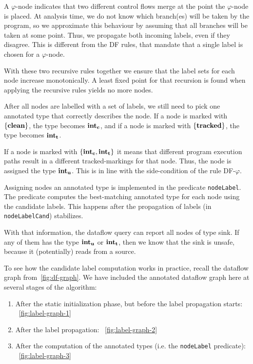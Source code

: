 A $\varphi$-node indicates that two different control flows merge at the point
the $\varphi$-node is placed.
At analysis time, we do not know which branch(es) will be taken by the program,
so we approximate this behaviour by assuming that all branches will be taken at some point.
Thus, we propagate both incoming labels, even if they disagree.
This is different from the DF rules, that mandate that a single label is chosen
for a $\varphi$-node.

With these two recursive rules together we ensure that the label sets for each node
increase monotonically.
A least fixed point for that recursion is found when applying the recursive rules yields
no more nodes.

After all nodes are labelled with a set of labels, we still need to pick one annotated type
that correctly describes the node.
If a node is marked with $\{\textbf{clean}\}$, the type becomes $\textbf{int}_\textbf{c}$,
and if a node is marked with $\{\textbf{tracked}\}$, the type becomes $\textbf{int}_\textbf{t}$.

If a node is marked with $\{\textbf{int}_\textbf{c}, \textbf{int}_\textbf{t}\}$ it means that different
program execution paths result in a different tracked-markings for that node.
Thus, the node is assigned the type $\textbf{int}_\textbf{u}$.
This is in line with the side-condition of the rule \textsc{DF-$\varphi$}.

Assigning nodes an annotated type is implemented in the predicate \texttt{nodeLabel}.
The predicate computes the best-matching annotated type for each node using the candidate labels.
This happens after the propagation of labels (in \texttt{nodeLabelCand}) stabilizes.

With that information, the dataflow query can report all nodes of type sink.
If any of them has the type $\textbf{int}_\textbf{u}$ or $\textbf{int}_\textbf{t}$, then we know that the sink
is unsafe, because it (potentially) reads from a source.

To see how the candidate label computation works in practice, recall the dataflow graph
from~\autoref{fig:df-graph}.
We have included the annotated dataflow graph here at several stages of the algorithm:
\begin{enumerate}
    \item After the static initialization phase, but before the label propagation starts:
     ~\autoref{fig:label-graph-1}
    \item After the label propagation: ~\autoref{fig:label-graph-2}
    \item After the computation of the annotated types (i.e. the \texttt{nodeLabel} predicate):
     ~\autoref{fig:label-graph-3}
\end{enumerate}

